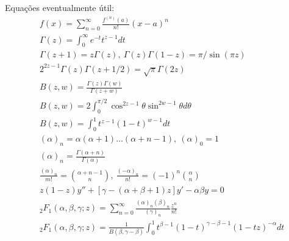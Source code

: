 \documentclass[a4paper,12pt, leqno, answers]{exam}
\begin{document}
\thispagestyle{empty}

\newpage
\setcounter{page}{1}
Equa\c{c}\~{o}es eventualmente útil:
\begin{align}
    & f(x) = \sum_{n = 0}^\infty \frac{f^{(n)}(a)}{n!} (x - a)^n \tag{ST} \label{eq:ser_taylor} \\
    & \Gamma(z) = \int_0^\infty e^{-t} t^{z - 1} dt \tag{GE} \label{eq:gamma_euler} \\
    & \Gamma(z + 1) = z \Gamma(z), \ \Gamma(z) \Gamma(1 - z) = \pi / \sin(\pi z) \label{eq:gamma_rel} \\
    & 2^{2 z - 1} \Gamma(z) \Gamma(z + 1/2) = \sqrt{\pi} \Gamma(2 z) \label{eq:gamma_dup_legendre} \\
    & B(z, w) = \frac{\Gamma(z) \Gamma(w)}{\Gamma(z + w)} \tag{BG} \label{eq:beta} \\
    & B(z, w) = 2 \int_0^{\pi / 2} \cos^{2z - 1} \theta \sin^{2w - 1} \theta d\theta \tag{BT} \label{eq:beta_trig} \\
    & B(z, w) = \int_0^1 t^{z - 1} (1 - t)^{w - 1} dt \tag{BI} \label{eq:beta_int} \\
    & (\alpha)_n = \alpha (\alpha + 1) \ldots (\alpha + n - 1), \ (\alpha)_0 = 1 \tag{SP} \label{eq:sim_poch} \\
    & (\alpha)_n = \frac{\Gamma(\alpha + n)}{\Gamma(\alpha)} \label{eq:sim_poch_gamma} \\
    & \frac{(\alpha)_n}{m!} = \binom{\alpha + n - 1}{n}, \ \frac{(-\alpha)_n}{n!} = (-1)^n \binom{\alpha}{n} \label{eq:sim_poch_binom} \\
    & z(1 - z)y'' + \left[ \gamma - (\alpha + \beta + 1) z \right] y' - \alpha \beta y = 0 \tag{EH} \label{eq:hiperg} \\
    & {}_2F_1(\alpha, \beta, \gamma; z) = \sum_{n = 0}^\infty \frac{(\alpha)_n (\beta)_n}{(\gamma)_n} \frac{z^n}{n!} \tag{SH} \label{eq:ser_hiperg} \\
    & {}_2F_1(\alpha, \beta, \gamma; z) = \frac{1}{B(\beta, \gamma - \beta)} \int_0^1 t^{\beta - 1} (1- t)^{\gamma - \beta - 1} (1 - tz)^{-\alpha} dt \label{eq:hiperg_int} \\

\end{align}
\end{document}
